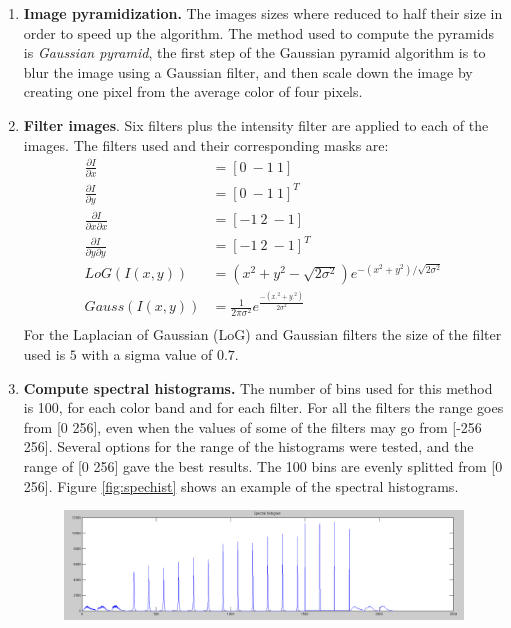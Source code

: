 \documentclass[a4paper,12pt]{article}
\begin{document}
\begin{enumerate}
    \item \textbf{Image pyramidization. } The images sizes where reduced
        to half their size in order to speed up the algorithm. The method used
        to compute the pyramids is \emph{Gaussian pyramid}, the first
        step of the Gaussian pyramid algorithm is to blur the image 
        using a Gaussian filter, and then scale down the image by 
        creating one pixel from the average color of four pixels.
    \item \textbf{Filter images}. Six filters plus the intensity
        filter are applied to each of the images. The filters 
        used and their corresponding masks are:
        \begin{equation}
            \begin{split}
                \frac{\partial I}{\partial x} & =  [0~-1~1] \\
                \frac{\partial I}{\partial y} & =  [0~-1~1]^T \\
                \frac{\partial I}{\partial x \partial x} & = [-1~2~-1] \\
                \frac{\partial I}{\partial y \partial y} & = [-1~2~-1]^T \\
                LoG(I(x,y))  & = ( x^2 + y^2 - \sqrt{2\sigma^2} ) e^{ -(x^2+y^2)/\sqrt{2\sigma^2}}\\
                Gauss(I(x,y))  & = \frac{1}{2 \pi \sigma^2} e^{ \frac{-(x.^2+y.^2)}{2\sigma^2}}\\
            \end{split}
        \end{equation}
        For the Laplacian of Gaussian (LoG) and Gaussian filters the size of the filter
        used is $5$ with a sigma value of $0.7$.
    \item \textbf{Compute spectral histograms.} The number of bins used
        for this method is 100, for each color band and for each filter. 
        For all the filters the range goes from [0 256], even when the values of some
        of the filters may go from [-256 256]. Several options for the range of the 
        histograms were tested, and the range of [0 256] gave the best results. 
        The 100 bins are evenly splitted from [0 256].
        Figure \ref{fig:spechist} shows an example of the spectral histograms. 
        \begin{figure}[h]
            \centering
            \includegraphics[totalheight=.22\textheight]{./Images/SpectralHist.png}

\end{figure}
\end{enumerate}
\end{document}

